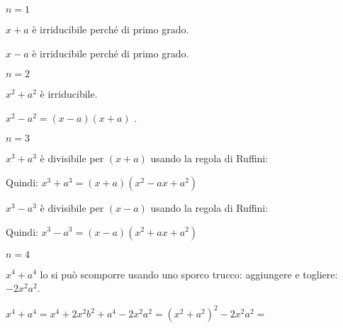 \begin{itemize*}
\item \(n=1\)
 \begin{itemize*}
  \item \(x+a\) è irriducibile perché di primo grado.
  \item \(x-a\) è irriducibile perché di primo grado.
 \end{itemize*}

 \item \(n=2\)
 \begin{itemize*}
  \item \(x^2+a^2\) è irriducibile.
  \item \(x^2-a^2=(x-a)(x+a)\) .
 \end{itemize*}

 \item \(n=3\)
 \begin{itemize*}
  \item 
 \begin{multicols}{2}
  \(x^3+a^3\) è divisibile per \((x+a)\) usando la regola di Ruffini:
   \begin{inaccessibleblock}
    \begin{center}
    
    \end{center}
    \end{inaccessibleblock}
 \end{multicols}
   Quindi: \(x^3+a^3=(x+a)(x^2-ax+a^2)\)
  \item 
 \begin{multicols}{2}
  \(x^3-a^3\) è divisibile per \((x-a)\) usando la regola di Ruffini:
   \begin{inaccessibleblock}
    \begin{center}
    
    \end{center}
    \end{inaccessibleblock}
 \end{multicols}
   Quindi: \(x^3-a^3=(x-a)(x^2+ax+a^2)\)
 \end{itemize*}

 \item \(n=4\)
 \begin{itemize*}
  \item \(x^4+a^4\) lo si può scomporre usando uno sporco trucco: 
   aggiungere e togliere:~\(-2x^2a^2\).
   
   \(x^4+a^4 = x^4+2x^2b^2+a^4-2x^2a^2 = (x^2+a^2)^2-2x^2a^2=\)
   

\end{itemize*}
\end{itemize*}
